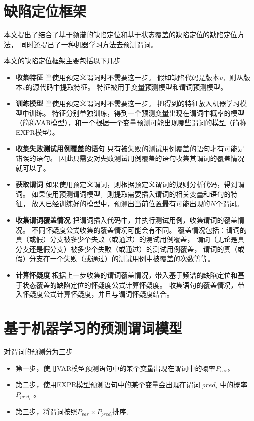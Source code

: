 \section{缺陷定位框架}
\label{sec:fl_frame}

本文提出了结合了基于频谱的缺陷定位和基于状态覆盖的缺陷定位的缺陷定位方法，
同时还提出了一种机器学习方法去预测谓词。

本文的缺陷定位框架主要包括以下几步
\begin{itemize}
\item \textbf{收集特征} 
当使用预定义谓词时不需要这一步。
假如缺陷代码是版本$v$，则从版本$v$的源代码中提取特征。
特征被用于变量预测模型和谓词预测模型。
\item \textbf{训练模型}
当使用预定义谓词时不需要这一步。
把得到的特征放入机器学习模型中训练。
特征分别单独训练，得到一个预测变量出现在谓词中概率的模型（简称VAR模型），和一个根据一个变量预测可能出现哪些谓词的模型（简称EXPR模型）。
\item \textbf{收集失败测试用例覆盖的语句}
只有被失败的测试用例覆盖的语句才有可能是错误的语句。
因此只需要对失败测试用例覆盖的语句收集其谓词的覆盖情况就可以了。
\item \textbf{获取谓词}
如果使用预定义谓词，则根据预定义谓词的规则分析代码，得到谓词。
如果使用预测谓词模型，则提取需要插入谓词的相关变量和语句的特征，
放入已经训练好的模型中，预测出当前位置最有可能出现的$N$个谓词。
\item \textbf{收集谓词覆盖情况}
把谓词插入代码中，并执行测试用例，收集谓词的覆盖情况。
不同怀疑度公式收集的覆盖情况可能会有不同。
覆盖情况包括：谓词的真（或假）分支被多少个失败（或通过）的测试用例覆盖，
谓词（无论是真分支还是假分支）被多少个失败（或通过）的测试用例覆盖，
谓词的真（或假）分支在一个失败（或通过）的测试用例中被覆盖的次数等等。
\item \textbf{计算怀疑度}
根据上一步收集的谓词覆盖情况，带入基于频谱的缺陷定位和基于状态覆盖的缺陷定位的怀疑度公式计算怀疑度。
收集语句的覆盖情况，带入怀疑度公式计算怀疑度，并且与谓词怀疑度结合。
\end{itemize}

\section{基于机器学习的预测谓词模型}

对谓词的预测分为三步：
\begin{itemize}
\item 第一步，使用VAR模型预测语句中的某个变量出现在谓词中的概率$P_{var}$。
\item 第二步，使用EXPR模型预测语句中的某个变量会出现在谓词 $pred_i$ 中的概率 $P_{pred_i}$ 。
\item 第三步，将谓词按照$P_{var} \times P_{pred_i}$排序。
\end{itemize}

